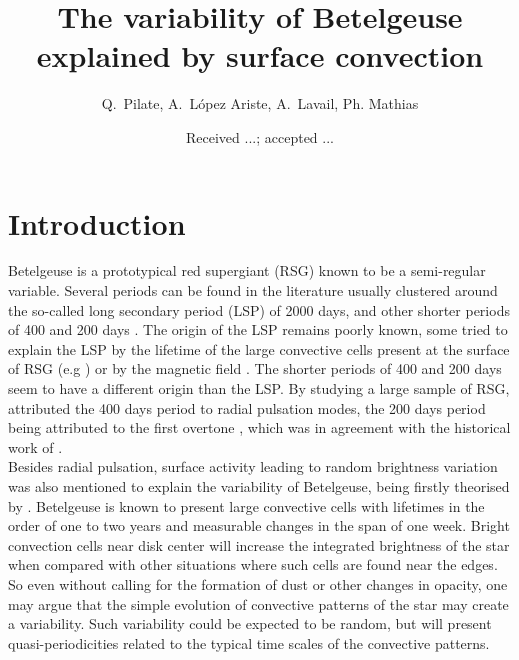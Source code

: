 \documentclass{aa}
\begin{document}
 


   \title{The variability  of Betelgeuse explained by surface convection}


    \author{{ Q.~Pilate},{ A.~L{\'o}pez Ariste},{ A.~Lavail},{ Ph. Mathias} }


   \date{Received ...; accepted ...}

 
  \abstract


   \keywords{
               }

   \maketitle
%

\section{Introduction}

Betelgeuse is a prototypical red supergiant (RSG) known to be a semi-regular variable. Several periods can be found in the 
literature usually clustered around the so-called long secondary period (LSP) of 2000 days, and other shorter periods of 400 and 200 days \citep{kiss_variability_2006}. The origin of the LSP remains poorly known, some tried to explain the LSP by the lifetime of the large convective cells present at the surface of RSG (e.g \cite{stothers_giant_2010}) or by the magnetic field \citep{wood_long_2004}. The shorter periods of 400 and 200 days seem to have a different origin than the LSP. By studying a large sample of RSG, \cite{kiss_variability_2006} attributed the 400 days period to radial pulsation modes, the 200 days period being attributed to the first overtone \citep{joyce_standing_2020}, which was in agreement with the historical work of \cite{stothers_pulsation_1969}.\\

Besides radial pulsation, surface activity leading to random brightness variation was also mentioned to explain the variability of Betelgeuse, being firstly theorised by \cite{schwarzschild_scale_1975}. Betelgeuse is known to present large convective cells with lifetimes in the order of one to two years \citep{lopez_ariste_convective_2018} and measurable changes 
in the span of one week. Bright convection cells near disk center will increase the integrated brightness of the star when 
compared with other situations where such cells are found near the edges. So even without calling for the formation of 
dust or other changes in opacity, one may argue that the simple evolution of convective patterns of the star may create a variability. Such 
variability could be expected to be random, but will present quasi-periodicities related to the typical time scales of the 
convective patterns. \\
\end{document}
